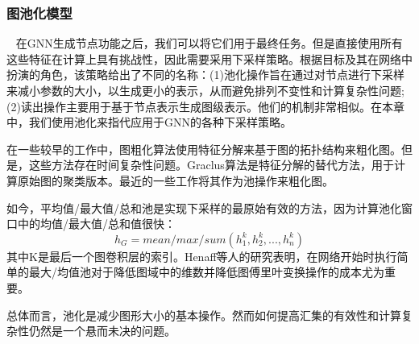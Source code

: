 \subsubsection{图池化模型}
  在GNN生成节点功能之后，我们可以将它们用于最终任务。但是直接使用所有这些特征在计算上具有挑战性，因此需要采用下采样策略。根据目标及其在网络中扮演的角色，该策略给出了不同的名称：(1)池化操作旨在通过对节点进行下采样来减小参数的大小，以生成更小的表示，从而避免排列不变性和计算复杂性问题; (2)读出操作主要用于基于节点表示生成图级表示。他们的机制非常相似。在本章中，我们使用池化来指代应用于GNN的各种下采样策略。

在一些较早的工作中，图粗化算法使用特征分解来基于图的拓扑结构来粗化图。但是，这些方法存在时间复杂性问题。Graclus算法是特征分解的替代方法，用于计算原始图的聚类版本。最近的一些工作将其作为池操作来粗化图。

如今，平均值/最大值/总和池是实现下采样的最原始有效的方法，因为计算池化窗口中的均值/最大值/总和值很快：
\[
h_G=mean/max/sum(h_1^{k},h_2^{k},...,h_n^{k})
\]
其中K是最后一个图卷积层的索引。Henaff等人的研究\cite{henaff2015deep}表明，在网络开始时执行简单的最大/均值池对于降低图域中的维数并降低图傅里叶变换操作的成本尤为重要。

总体而言，池化是减少图形大小的基本操作。然而如何提高汇集的有效性和计算复杂性仍然是一个悬而未决的问题。
